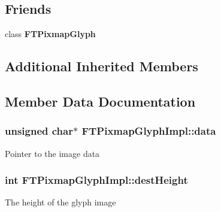 \subsection*{Friends}
\begin{DoxyCompactItemize}
\item 
class {\bfseries F\+T\+Pixmap\+Glyph}\hypertarget{class_f_t_pixmap_glyph_impl_ab141fccf761e39b9e4bec64cda0507a7}{}\label{class_f_t_pixmap_glyph_impl_ab141fccf761e39b9e4bec64cda0507a7}

\end{DoxyCompactItemize}
\subsection*{Additional Inherited Members}


\subsection{Member Data Documentation}
\subsubsection[{\texorpdfstring{data}{data}}]{\setlength{\rightskip}{0pt plus 5cm}unsigned char$\ast$ F\+T\+Pixmap\+Glyph\+Impl\+::data\hspace{0.3cm}{\ttfamily [private]}}\hypertarget{class_f_t_pixmap_glyph_impl_aca6f17adecedb7beb8a98f90b1a1bba6}{}\label{class_f_t_pixmap_glyph_impl_aca6f17adecedb7beb8a98f90b1a1bba6}
Pointer to the \textquotesingle{}image\textquotesingle{} data 
\subsubsection[{\texorpdfstring{dest\+Height}{destHeight}}]{\setlength{\rightskip}{0pt plus 5cm}int F\+T\+Pixmap\+Glyph\+Impl\+::dest\+Height\hspace{0.3cm}{\ttfamily [private]}}\hypertarget{class_f_t_pixmap_glyph_impl_a6a0513a5a517e50ac0516b3f61f80605}{}\label{class_f_t_pixmap_glyph_impl_a6a0513a5a517e50ac0516b3f61f80605}
The height of the glyph \textquotesingle{}image\textquotesingle{} 
